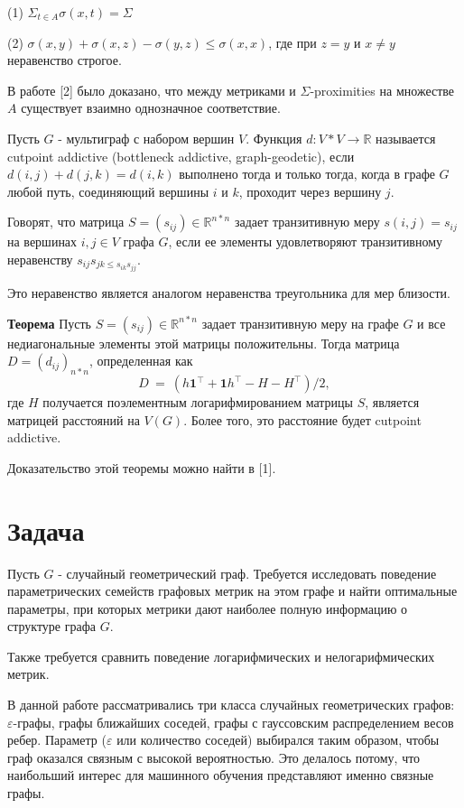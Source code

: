 (1) $\Sigma _{t \in A} \sigma (x,t) = \Sigma$

(2) $\sigma(x,y) + \sigma(x,z) - \sigma(y,z) \le \sigma(x,x)$, где при $z = y$ и $x \ne y$ неравенство строгое.

В работе [2] было доказано, что между метриками и $\Sigma$-proximities на множестве $A$ существует взаимно однозначное соответствие.


Пусть $G$ - мультиграф с набором вершин $V$. Функция $d: V*V \rightarrow \mathbb{R}$ называется cutpoint addictive (bottleneck addictive, graph-geodetic), если $d(i,j)+d(j,k) = d(i,k)$ выполнено тогда и только тогда, когда в графе $G$ любой путь, соединяющий вершины $i$ и $k$, проходит через вершину $j$.

Говорят, что матрица $S=(s_{ij}) \in \mathbb{R}^{n*n}$ задает транзитивную меру $s(i,j) = s_{ij}$ на вершинах $i,j \in V$ графа $G$, если ее элементы удовлетворяют транзитивному неравенству $s_{ij}s_{jk \le s_{ik}s_{jj}}$.

Это неравенство является аналогом неравенства треугольника для мер близости.

\textbf{Теорема}
Пусть $S=(s_{ij}) \in \mathbb{R}^{n*n}$ задает транзитивную меру на графе $G$ и все недиагональные элементы этой матрицы положительны. Тогда матрица $D = (d_{ij})_{n*n}$, определенная как
$$D~=~(h \textbf{1}^\intercal + \textbf{1} h^\intercal - H - H ^\intercal) /2,$$ 
где $H$ получается поэлементным логарифмированием матрицы $S$, является матрицей расстояний на $V(G)$. Более того, это расстояние будет cutpoint addictive.

Доказательство этой теоремы можно найти в [1].



\section{Задача} \label{sect1_2}

Пусть $G$ - случайный геометрический граф. Требуется исследовать поведение параметрических семейств графовых метрик на этом графе и найти оптимальные параметры, при которых метрики дают наиболее полную информацию о структуре графа $G$.

Также требуется сравнить поведение логарифмических и нелогарифмических метрик.

В данной работе рассматривались три класса случайных геометрических графов: $\varepsilon$-графы, графы ближайших соседей, графы с гауссовским распределением весов ребер. Параметр ($\varepsilon$ или количество соседей) выбирался таким образом, чтобы граф оказался связным с высокой вероятностью. Это делалось потому, что наибольший интерес для машинного обучения представляют именно связные графы.

